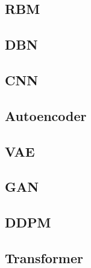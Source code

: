 \documentclass{myclass}
\begin{document}
\subsection{RBM}
\subsection{DBN}
\subsection{CNN}
\subsection{Autoencoder}
\subsection{VAE}
\subsection{GAN}
\subsection{DDPM}
\subsection{Transformer}


\end{document}
